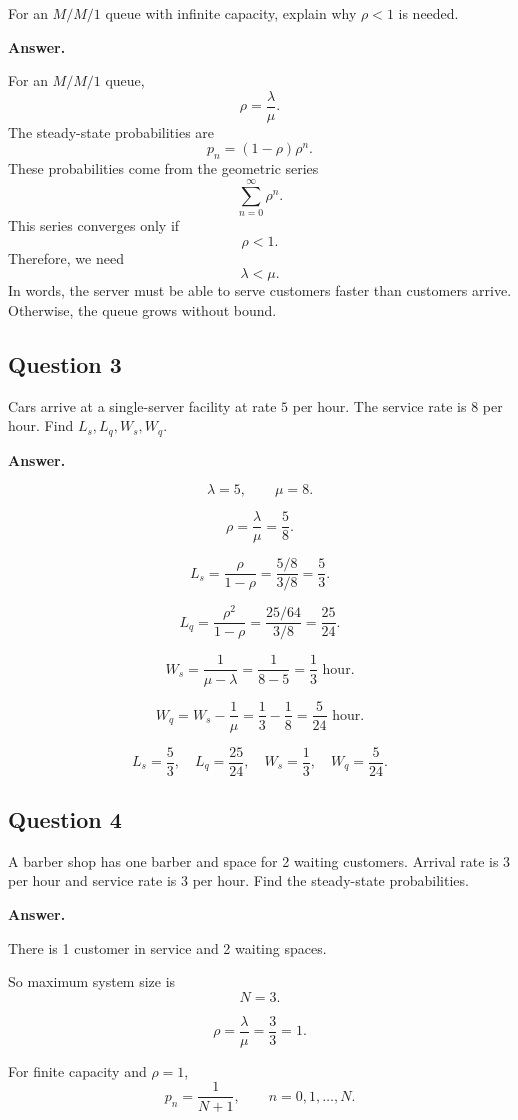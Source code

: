 \documentclass[12pt]{article}
\begin{document}
For an \(M/M/1\) queue with infinite capacity, explain why \(\rho<1\) is needed.

\textbf{Answer.}

For an \(M/M/1\) queue,
\[
\rho=\frac{\lambda}{\mu}.
\]
The steady-state probabilities are
\[
p_n=(1-\rho)\rho^n.
\]
These probabilities come from the geometric series
\[
\sum_{n=0}^{\infty}\rho^n.
\]
This series converges only if
\[
\rho<1.
\]
Therefore, we need
\[
\lambda<\mu.
\]
In words, the server must be able to serve customers faster than customers arrive. Otherwise, the queue grows without bound.

\subsection*{Question 3}

Cars arrive at a single-server facility at rate \(5\) per hour. The service rate is \(8\) per hour. Find \(L_s,L_q,W_s,W_q\).

\textbf{Answer.}

\[
\lambda=5,\qquad \mu=8.
\]

\[
\rho=\frac{\lambda}{\mu}=\frac58.
\]

\[
L_s=\frac{\rho}{1-\rho}
=
\frac{5/8}{3/8}
=
\frac53.
\]

\[
L_q=\frac{\rho^2}{1-\rho}
=
\frac{25/64}{3/8}
=
\frac{25}{24}.
\]

\[
W_s=\frac{1}{\mu-\lambda}
=
\frac{1}{8-5}
=
\frac13\text{ hour}.
\]

\[
W_q=W_s-\frac1{\mu}
=
\frac13-\frac18
=
\frac{5}{24}\text{ hour}.
\]

\[
\boxed{
L_s=\frac53,\quad L_q=\frac{25}{24},\quad W_s=\frac13,\quad W_q=\frac{5}{24}.
}
\]

\subsection*{Question 4}

A barber shop has one barber and space for 2 waiting customers. Arrival rate is \(3\) per hour and service rate is \(3\) per hour. Find the steady-state probabilities.

\textbf{Answer.}

There is 1 customer in service and 2 waiting spaces.

So maximum system size is
\[
N=3.
\]

\[
\rho=\frac{\lambda}{\mu}=\frac33=1.
\]

For finite capacity and \(\rho=1\),
\[
p_n=\frac{1}{N+1},\qquad n=0,1,\ldots,N.
\]
\end{document}
